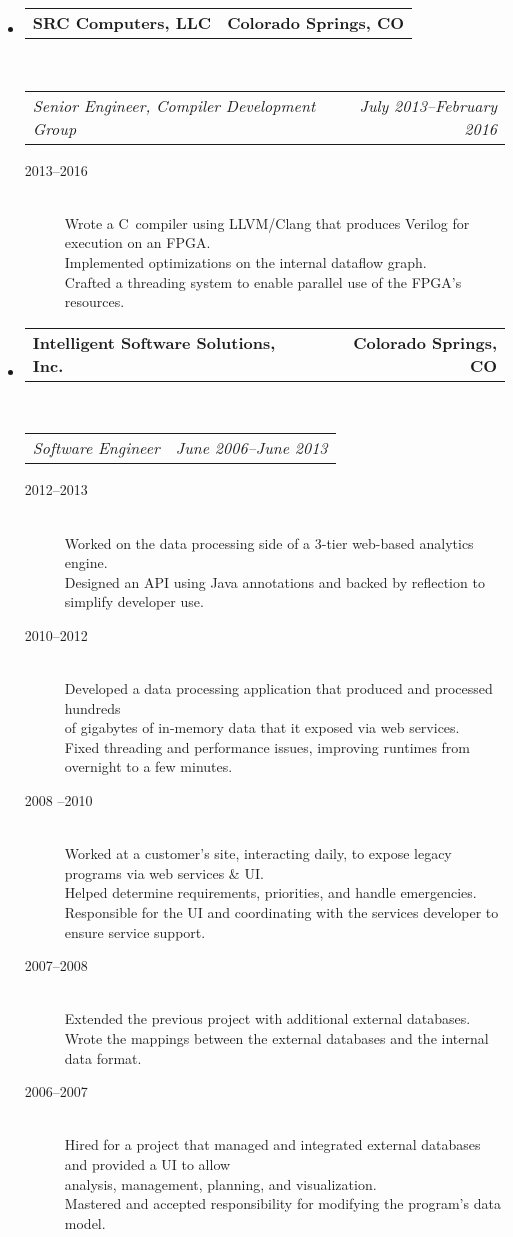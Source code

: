 \documentclass[10pt,letterpaper]{article}
\makeatletter
\newcommand{\headerrow}[2]
{\begin{tabular*}{\linewidth}{l@{\extracolsep{\fill}}r}
  #1 &
  #2 \\
\end{tabular*}}
\newcommand{\CPP}
{C\nolinebreak[4]\hspace{-.05em}\raisebox{.22ex}{\footnotesize\bf ++}}
\makeatother
\begin{document}
\begin{itemize}
  \item
  \headerrow
    {\textbf{SRC Computers, LLC}}
    {\textbf{Colorado Springs, CO}}
  \\
  \headerrow
    {\emph{Senior Engineer, Compiler Development Group}}
    {\emph{July 2013--February 2016}}
  \begin{description}
    \item[2013--2016] \hfill \\
        Wrote a \CPP \  compiler using LLVM/Clang that produces Verilog for execution on an FPGA. \\
        Implemented optimizations on the internal dataflow graph. \\
        Crafted a threading system to enable parallel use of the FPGA’s resources.
  \end{description}

  \item
  \headerrow
    {\textbf{Intelligent Software Solutions, Inc.}}
    {\textbf{Colorado Springs, CO}}
  \\
  \headerrow
    {\emph{Software Engineer}}
    {\emph{June 2006--June 2013}}
  \begin{description}
    \item[2012--2013] \hfill \\
        Worked on the data processing side of a 3-tier web-based analytics engine. \\
        Designed an API using Java annotations and backed by reflection to simplify developer use.
    \item[2010--2012] \hfill \\
        Developed a data processing application that produced and processed hundreds \\  of gigabytes of in-memory data that it exposed via web services. \\
        Fixed threading and performance issues, improving runtimes from overnight to a few minutes.
    \item[2008 --2010] \hfill \\
        Worked at a customer’s site, interacting daily, to expose legacy programs via web services \& UI. \\
        Helped determine requirements, priorities, and handle emergencies. \\
        Responsible for the UI and coordinating with the services developer to ensure service support.
    \item[2007--2008] \hfill \\
        Extended the previous project with additional external databases. \\
        Wrote the mappings between the external databases and the internal data format.
    \item[2006--2007] \hfill \\
        Hired for a project that managed and integrated external databases and provided a UI to allow \\ analysis, management, planning, and visualization. \\
        Mastered and accepted responsibility for modifying the program’s data model.
  \end{description}


\end{itemize}
\end{document}
